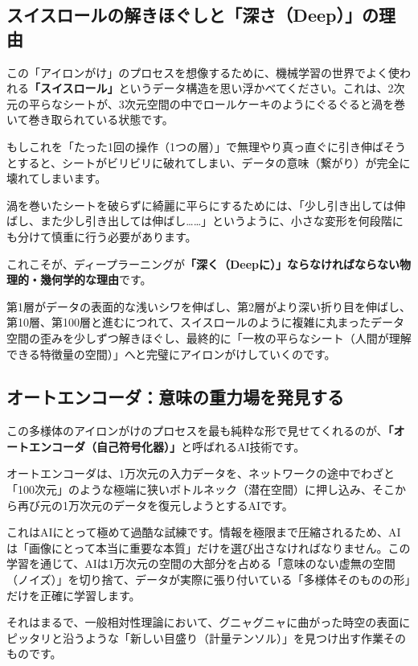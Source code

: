 \subsection{スイスロールの解きほぐしと「深さ（Deep）」の理由}

この「アイロンがけ」のプロセスを想像するために、機械学習の世界でよく使われる\textbf{「スイスロール」}というデータ構造を思い浮かべてください。これは、2次元の平らなシートが、3次元空間の中でロールケーキのようにぐるぐると渦を巻いて巻き取られている状態です。

もしこれを「たった1回の操作（1つの層）」で無理やり真っ直ぐに引き伸ばそうとすると、シートがビリビリに破れてしまい、データの意味（繋がり）が完全に壊れてしまいます。

渦を巻いたシートを破らずに綺麗に平らにするためには、「少し引き出しては伸ばし、また少し引き出しては伸ばし\ldots{}\ldots{}」というように、小さな変形を何段階にも分けて慎重に行う必要があります。

これこそが、ディープラーニングが\textbf{「深く（Deepに）」ならなければならない物理的・幾何学的な理由}です。

第1層がデータの表面的な浅いシワを伸ばし、第2層がより深い折り目を伸ばし、第10層、第100層と進むにつれて、スイスロールのように複雑に丸まったデータ空間の歪みを少しずつ解きほぐし、最終的に「一枚の平らなシート（人間が理解できる特徴量の空間）」へと完璧にアイロンがけしていくのです。

\subsection{オートエンコーダ：意味の重力場を発見する}

この多様体のアイロンがけのプロセスを最も純粋な形で見せてくれるのが、\textbf{「オートエンコーダ（自己符号化器）」}と呼ばれるAI技術です。

オートエンコーダは、1万次元の入力データを、ネットワークの途中でわざと「100次元」のような極端に狭いボトルネック（潜在空間）に押し込み、そこから再び元の1万次元のデータを復元しようとするAIです。

これはAIにとって極めて過酷な試練です。情報を極限まで圧縮されるため、AIは「画像にとって本当に重要な本質」だけを選び出さなければなりません。この学習を通じて、AIは1万次元の空間の大部分を占める「意味のない虚無の空間（ノイズ）」を切り捨て、データが実際に張り付いている「多様体そのものの形」だけを正確に学習します。

それはまるで、一般相対性理論において、グニャグニャに曲がった時空の表面にピッタリと沿うような「新しい目盛り（計量テンソル）」を見つけ出す作業そのものです。

